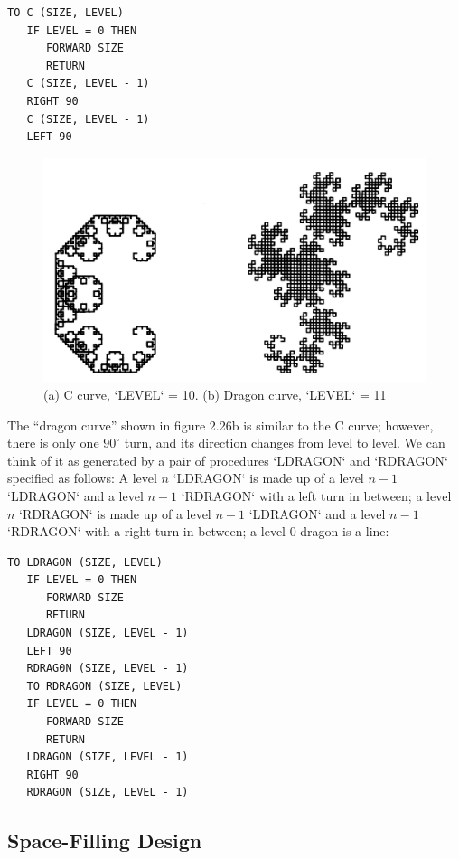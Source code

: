\documentclass{book}
\begin{document}
\begin{verbatim}
TO C (SIZE, LEVEL)
   IF LEVEL = 0 THEN
      FORWARD SIZE
      RETURN
   C (SIZE, LEVEL - 1)
   RIGHT 90
   C (SIZE, LEVEL - 1)
   LEFT 90
\end{verbatim}
\begin{figure}
\begin{center}
\includegraphics[scale=1]{fig2-26}
\caption{(a) C curve, \textsc{`LEVEL`} = 10. (b) Dragon curve, \textsc{`LEVEL`} = 11}
\end{center}
\end{figure}

The ``dragon curve'' shown in figure 2.26b is similar to the C curve;
however, there is only one $90^{\circ}$ turn, and its direction changes from level
to level. We can think of it as generated by a pair of procedures \textsc{`LDRAGON`}
and \textsc{`RDRAGON`} specified as follows: A level $n$ \textsc{`LDRAGON`} is made up of a level
$n - 1$ \textsc{`LDRAGON`} and a level $n - 1$ \textsc{`RDRAGON`} with a left turn in between; a
level $n$ \textsc{`RDRAGON`} is made up of a level $n - 1$ \textsc{`LDRAGON`} and a level $n - 1$
\textsc{`RDRAGON`} with a right turn in between; a level 0 dragon is a line:

\begin{verbatim}
TO LDRAGON (SIZE, LEVEL)
   IF LEVEL = 0 THEN
      FORWARD SIZE
      RETURN
   LDRAGON (SIZE, LEVEL - 1)
   LEFT 90
   RDRAG0N (SIZE, LEVEL - 1)
   TO RDRAGON (SIZE, LEVEL)
   IF LEVEL = 0 THEN
      FORWARD SIZE
      RETURN
   LDRAGON (SIZE, LEVEL - 1)
   RIGHT 90
   RDRAGON (SIZE, LEVEL - 1) 
\end{verbatim}
\subsection{Space-Filling Design}
\end{document}
